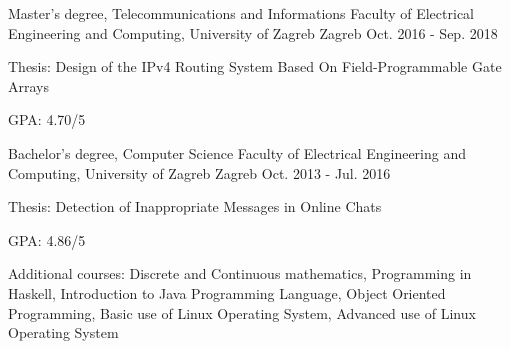 
\begin{cventries}

  \cventry
    {Master's degree, Telecommunications and Informations} %
    {Faculty of Electrical Engineering and Computing, University of Zagreb} %
    {Zagreb} %
    {Oct. 2016 - Sep. 2018} %
    {
      \begin{cvitems} %
        \item {Thesis: Design of the IPv4 Routing System Based On Field-Programmable Gate Arrays}
        \item {GPA: 4.70/5}
      \end{cvitems}
    }

  \cventry
    {Bachelor's degree, Computer Science} %
    {Faculty of Electrical Engineering and Computing, University of Zagreb} %
    {Zagreb} %
    {Oct. 2013 - Jul. 2016} %
    {
      \begin{cvitems} %
        \item {Thesis: Detection of Inappropriate Messages in Online Chats}
        \item {GPA: 4.86/5}
        \item {Additional courses: Discrete and Continuous mathematics, Programming in Haskell, Introduction to Java Programming Language, Object Oriented Programming, Basic use of Linux Operating System, Advanced use of Linux Operating System}
      \end{cvitems}
    }

\end{cventries}
